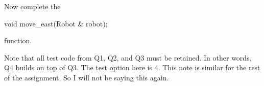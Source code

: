 Now complete the
{\small
\begin{console}
void move_east(Robot & robot);
\end{console}
}
function.

Note that all test code from Q1, Q2, and Q3 must be retained.
In other words, Q4 builds on top of Q3.
The test option here is 4.
This note is similar for the rest of the assignment.
So I will not be saying this again.

